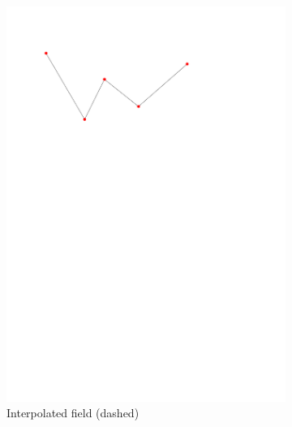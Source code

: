 \begin{figure}
\begin{subfigure}[b]{0.35\linewidth}
    \includegraphics[width=\textwidth,page=2]{figs/1Ddensop.pdf}
    \caption{Interpolated field (dashed)}\label{fig:1Ddensop:b}
  \end{subfigure}
  \quad
  \begin{subfigure}[b]{0.35\linewidth}
    \centering

\end{subfigure}
\end{figure}
